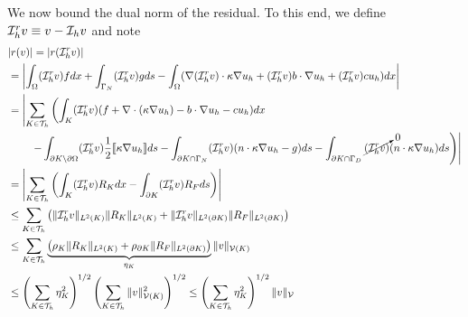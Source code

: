 We now bound the dual norm of the residual.  To this end, we define $\mathcal{I}_h^r v \equiv v - \mathcal{I}_h v$ and note 
\begin{align*}
  &|r(v)|
  =
  |r(\mathcal{I}_h^r v)|
  \\
  &=
  \left| \int_\Omega (\mathcal{I}_h^r v) f dx + \int_{\Gamma_N} (\mathcal{I}_h^r v) g ds
  - \int_\Omega (\nabla (\mathcal{I}_h^r v) \cdot \kappa \nabla u_h + (\mathcal{I}_h^r v) b \cdot \nabla u_h + (\mathcal{I}_h^r v) c u_h) dx \right|
  \\
  &=
  \left| \sum_{K \in \mathcal{T}_h} \left( \int_K (\mathcal{I}_h^r v) (f + \nabla \cdot (\kappa \nabla u_h) - b \cdot \nabla u_h - c u_h ) dx \right.\right.
  \\ & \qquad \left.\left. - \int_{\partial K \setminus \partial \Omega} (\mathcal{I}_h^r v) \frac{1}{2} \llbracket \kappa \nabla u_h \rrbracket ds
  - \int_{\partial K \cap \Gamma_N} (\mathcal{I}_h^r v) (n\cdot \kappa \nabla u_h - g ) ds
  - \int_{\partial K \cap \Gamma_D} \cancelto{0}{(\mathcal{I}_h^r v)} (n\cdot \kappa \nabla u_h) ds
  \right)\right|
  \\
  &= \left| \sum_{K \in \mathcal{T}_h} \left( \int_K (\mathcal{I}_h^r v) R_K dx
  - \int_{\partial K} (\mathcal{I}_h^r v) R_F ds \right) \right|
  \\
  &\leq \sum_{K \in \mathcal{T}_h} \left(
  \| \mathcal{I}_h^r v \|_{L^2(K)}  \| R_K \|_{L^2(K)} +
  \| \mathcal{I}_h^r v \|_{L^2(\partial K)} \| R_F \|_{L^2(\partial K)}  \right)
  \\
  &\leq \sum_{K \in \mathcal{T}_h} \underbrace{ \left(
  \rho_K \| R_K \|_{L^2(K)} + \rho_{\partial K} \| R_F \|_{L^2(\partial K)} 
  \right) }_{\eta_K} \| v \|_{\mathcal{V}(K)}
  \\
  &\leq \left( \sum_{K \in \mathcal{T}_h} \eta_K^2 \right)^{1/2} \left( \sum_{K \in \mathcal{T}_h} \| v \|_{\mathcal{V}(K)}^2 \right)^{1/2}
  \leq  \left( \sum_{K \in \mathcal{T}_h} \eta_K^2 \right)^{1/2} \| v \|_{\mathcal{V}}
\end{align*}
